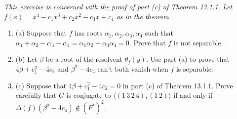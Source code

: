 \documentclass[11pt,a4paper]{article}
\newcommand{\be} {\begin{enumerate}}
\newcommand{\ee} {\end{enumerate}}
\begin{document}
{\it This exercise is concerned with the proof of part (c) of Theorem 13.1.1. Let $f(x) = x^4-c_1x^3+c_2x^2-c_3x+c_4$ as in the theorem.
\be
\item[(a)] Suppose that $f$ has roots $\alpha_1,\alpha_2,\alpha_3,\alpha_4$ such that $\alpha_1+\alpha_2 - \alpha_3-\alpha_4 = \alpha_1\alpha_2 - \alpha_3 \alpha_4 = 0$. Prove that $f$ is not separable.
\item[(b)] Let $\beta$ be a root of the resolvent $\theta_f(y)$. Use part (a) to prove that $4\beta+c_1^2-4c_2$ and $\beta^2 - 4 c_4$ can't both vanish when $f$ is separable.
\item[(c)] Suppose that $4\beta+c_1^2-4c_2=0$ in part (c) of Theorem 13.1.1. Prove carefully that $G$ is conjugate to $\langle (1\,3\,2\,4),(1\,2) \rangle$ if and only if $\Delta(f)(\beta^2 - 4 c_4) \not \in (F^*)^2$.
\ee
}
\end{document}
